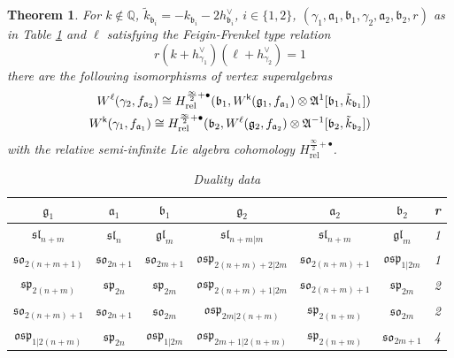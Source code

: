 \documentclass[a4paper, reqno]{amsart}
\newtheorem{theorem}{Theorem}[section]
\theoremstyle{introTheorems}
\newcommand\g\gamma
\renewcommand{\1}{\mathbbold{1}}
\begin{document}
\begin{theorem}{\textup{\cite{CLNS}}}
For $k \notin \mathbb Q$,  $\tilde k_{\mathfrak b_i} = - k_{\mathfrak b_i} -2h^\vee_{\mathfrak b_i}$, $i \in \{ 1, 2\}$,  $(\g_1, \mathfrak a_1, \mathfrak b_1, \g_2, \mathfrak a_2, \mathfrak b_2, r)$ as in Table \ref{tab:duality data} and $\ell$ satisfying the Feigin-Frenkel type relation
\[
r(k+ h^\vee_{\g_1})(\ell + h^\vee_{\g_2}) =1
\] there are the following isomorphisms of vertex superalgebras
\begin{align*}
     W^\ell(\g_2, f_{\mathfrak a_2}) \cong H^{\frac{\infty}{2}+\bullet}_{\mathrm{rel}}(\mathfrak b_1, W^\k(\mathfrak{g}_1, f_{\mathfrak a_1})\otimes\mathfrak A^1[\mathfrak b_1, \tilde k_{\mathfrak b_1}]) \\
      W^\k(\g_1, f_{\mathfrak a_1}) \cong H^{\frac{\infty}{2}+\bullet}_{\mathrm{rel}}(\mathfrak b_2, W^\ell(\mathfrak{g}_2, f_{\mathfrak a_2})\otimes\mathfrak A^{-1}[\mathfrak b_2, \tilde k_{\mathfrak b_2}])
\end{align*}
with the relative semi-infinite Lie algebra cohomology $ H^{\frac{\infty}{2}+\bullet}_{\mathrm{rel}}$.
    


\begin{table}[h]
\centering
\begin{tabular}{|c|c|c|c|c|c|c|}
\hline 
 $\mathfrak{g}_1$ & $\mathfrak{a}_1$ & $\mathfrak{b}_1$ & $\mathfrak{g}_2$ & $\mathfrak{a}_2$ & $\mathfrak{b}_2$ & r \\ \hline 
 $\mathfrak{sl}_{n+m}$            & $\mathfrak{sl}_n$      & $\mathfrak{gl}_m$        &  $\mathfrak{sl}_{n+m|m}$           & $\mathfrak{sl}_{n+m}$          & $\mathfrak{gl}_m$ & 1 \\ 
$\mathfrak{so}_{2(n+m+1)}$        & $\mathfrak{so}_{2n+1}$ & $\mathfrak{so}_{2m+1}$   & $\mathfrak{osp}_{2(n+m)+2|2m}$    & $\mathfrak{so}_{2(n+m)+1}$     & $\mathfrak{osp}_{1|2m}$  & 1 \\
$\mathfrak{sp}_{2(n+m)}$          & $\mathfrak{sp}_{2n}$   & $\mathfrak{sp}_{2m}$     & $\mathfrak{osp}_{2(n+m)+1|2m}$    & $\mathfrak{so}_{2(n+m)+1}$     & $\mathfrak{sp}_{2m}$  & 2 \\
 $\mathfrak{so}_{2(n+m)+1}$        & $\mathfrak{so}_{2n+1}$ & $\mathfrak{so}_{2m}$     & $\mathfrak{osp}_{2m|2(n+m)}$      & $\mathfrak{sp}_{2(n+m)}$       & $\mathfrak{so}_{2m}$  & 2\\
$\mathfrak{osp}_{1|2(n+m)}$       & $\mathfrak{sp}_{2n}$   & $\mathfrak{osp}_{1|2m}$  & $\mathfrak{osp}_{2m+1|2(n+m)}$    & $\mathfrak{sp}_{2(n+m)}$       & $\mathfrak{so}_{2m+1}$ & 4\\
\hline 
\end{tabular}
\caption{Duality data}
\label{tab:duality data}
\end{table}

\end{theorem}
\end{document}
